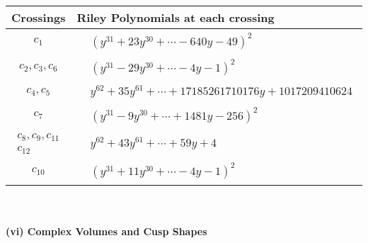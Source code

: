 \documentclass[1p]{elsarticle_modified}
\theoremstyle{definition}
\begin{document}
\begin{tabular}{m{50pt}|m{274pt}}
Crossings & \hspace{64pt}Riley Polynomials at each crossing \\
\hline $$\begin{aligned}c_{1}\end{aligned}$$&$\begin{aligned}
&(y^{31}+23 y^{30}+\cdots-640 y-49)^{2}
\end{aligned}$\\
\hline $$\begin{aligned}c_{2},c_{3},c_{6}\end{aligned}$$&$\begin{aligned}
&(y^{31}-29 y^{30}+\cdots-4 y-1)^{2}
\end{aligned}$\\
\hline $$\begin{aligned}c_{4},c_{5}\end{aligned}$$&$\begin{aligned}
&y^{62}+35 y^{61}+\cdots+17185261710176 y+1017209410624
\end{aligned}$\\
\hline $$\begin{aligned}c_{7}\end{aligned}$$&$\begin{aligned}
&(y^{31}-9 y^{30}+\cdots+1481 y-256)^{2}
\end{aligned}$\\
\hline $$\begin{aligned}c_{8},c_{9},c_{11}\\c_{12}\end{aligned}$$&$\begin{aligned}
&y^{62}+43 y^{61}+\cdots+59 y+4
\end{aligned}$\\
\hline $$\begin{aligned}c_{10}\end{aligned}$$&$\begin{aligned}
&(y^{31}+11 y^{30}+\cdots-4 y-1)^{2}
\end{aligned}$\\
\hline
\end{tabular}\\~\\
\newpage\flushleft \textbf{(vi) Complex Volumes and Cusp Shapes}
\end{document}

